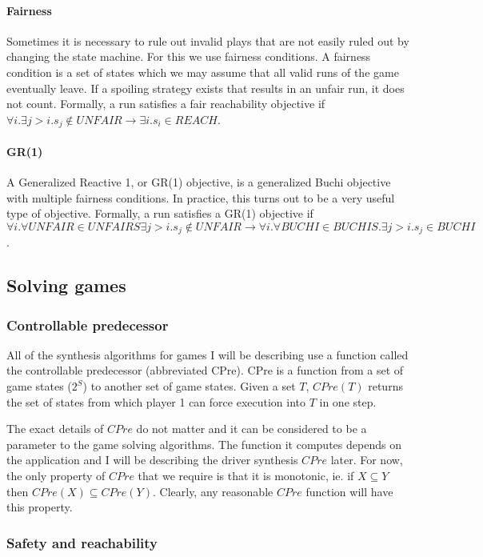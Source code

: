 \documentclass{book}
\theoremstyle{definition}
\begin{document}
\paragraph{Fairness}
Sometimes it is necessary to rule out invalid plays that are not easily ruled out by changing the state machine. For this we use fairness conditions. A fairness condition is a set of states which we may assume that all valid runs of the game eventually leave. If a spoiling strategy exists that results in an unfair run, it does not count. Formally, a run satisfies a fair reachability objective if $\forall i. \exists j>i. s_j \notin UNFAIR \rightarrow \exists i. s_i \in REACH$. 

\paragraph{GR(1)}
A Generalized Reactive 1, or GR(1) objective, is a generalized Buchi objective with multiple fairness conditions. In practice, this turns out to be a very useful type of objective. Formally, a run satisfies a GR(1) objective if $\forall i. \forall UNFAIR \in UNFAIRS \exists j>i. s_j \notin UNFAIR \rightarrow \forall i. \forall BUCHI \in BUCHIS. \exists j>i. s_j \in BUCHI$.

\subsection{Solving games}
\subsubsection{Controllable predecessor}

All of the synthesis algorithms for games I will be describing use a function called the controllable predecessor (abbreviated CPre). CPre is a function from a set of game states ($2^S$) to another set of game states. Given a set $T$, $CPre(T)$ returns the set of states from which player 1 can force execution into $T$ in one step. 

The exact details of $CPre$ do not matter and it can be considered to be a parameter to the game solving algorithms. The function it computes depends on the application and I will be describing the driver synthesis $CPre$ later. For now, the only property of $CPre$ that we require is that it is monotonic, ie. if $X \subseteq Y$ then $CPre(X) \subseteq CPre(Y)$. Clearly, any reasonable $CPre$ function will have this property.

\subsubsection{Safety and reachability}
\end{document}
